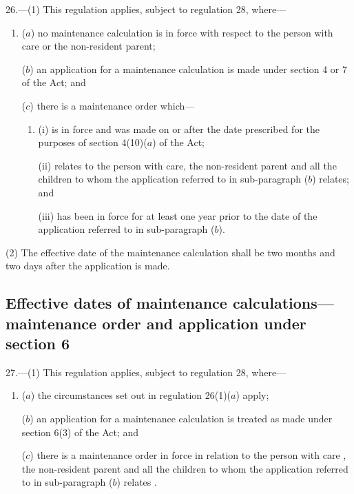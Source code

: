 \documentclass[12pt,a4paper]{article}
\begin{document}
26.---(1)  This regulation applies, subject to regulation 28, where—
\begin{enumerate}\item[]
($a$) no maintenance calculation is in force with respect to the person with care or the non-resident parent;

($b$) an application for a maintenance calculation is made under section 4 or 7 of the Act; and


($c$) there is a maintenance order which—
\begin{enumerate}\item[]
(i) is in force and was made on or after the date prescribed for the purposes of section 4(10)($a$)  of the Act;

(ii) relates to the person with care, the non-resident parent and all the children to whom the application referred to in sub-paragraph ($b$)  relates; and

(iii) has been in force for at least one year prior to the date of the application referred to in sub-paragraph ($b$).
\end{enumerate}
\end{enumerate}

(2) The effective date of the maintenance calculation shall be two months and two days after the application is made.


\subsection[27. Effective dates of maintenance calculations—maintenance order and application under section 6]{Effective dates of maintenance calculations—maintenance order and application under section 6}

27.---(1)  This regulation applies, subject to regulation 28, where—
\begin{enumerate}\item[]
($a$) the circumstances set out in regulation 26(1)($a$)  apply;

($b$) an application for a maintenance calculation is treated as made under section 6(3) of the Act; and

($c$) there is a maintenance order in force in relation to the person with care%
, the non-resident parent and all the children to whom the application referred to in sub-paragraph ($b$)  relates%
.
\end{enumerate}
\end{document}
